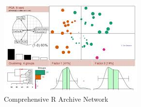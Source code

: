 \documentclass{beamer}
\begin{document}
\begin{frame}[fragile]
	
	
	\begin{figure}
\centering
\includegraphics[width=0.7\linewidth]{CRAN}
\caption{Comprehensive R Archive Network}

\end{figure}
	
	
\end{frame}
\end{document}
